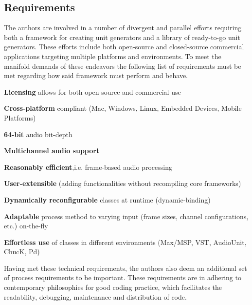 \documentclass[twoside,10pt]{article}
\newenvironment{packed_item}{
\begin{itemize}
  \setlength{\itemsep}{1pt}
  \setlength{\parskip}{0pt}
  \setlength{\parsep}{0pt}
}{\end{itemize}}
\begin{document}
\subsection{Requirements} \label{sec:Requirements}%

The authors are involved in a number of divergent and parallel efforts requiring both a framework for creating unit generators and a library of ready-to-go unit generators.  These efforts include both open-source and closed-source commercial applications targeting multiple platforms and environments.  To meet the manifold demands of these endeavors the following list of requirements must be met regarding how said framework must perform and behave.

\begin{packed_item}%
	\item \textbf{Licensing} allows for both open source and commercial use
	\item \textbf{Cross-platform} compliant (Mac, Windows, Linux, Embedded Devices, Mobile Platforms)	
	\item \textbf{64-bit} audio bit-depth
	\item \textbf{Multichannel audio support}
	\item \textbf{Reasonably efficient},i.e. frame-based audio processing
	\item \textbf{User-extensible} (adding functionalities without recompiling core frameworks)
	\item \textbf{Dynamically reconfigurable} classes at runtime (dynamic-binding)
	\item \textbf{Adaptable} process method to varying input (frame sizes, channel configurations, etc.) on-the-fly
	\item \textbf{Effortless use} of classes in different environments (Max/MSP, VST, AudioUnit, ChucK, Pd)
\end{packed_item}%


\noindent Having met these technical requirements, the authors also deem an additional set of process requirements to be important.  These requirements are in adhering to contemporary philosophies for good coding practice, 
which facilitates the readability, debugging, maintenance and distribution of code. 
\end{document}
